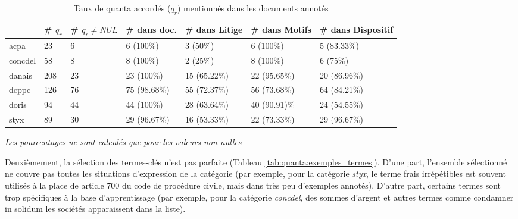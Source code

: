 \begin{table}[!htb]
	\scriptsize
	\begin{tabular}{|l|l|l|l|l|l|l|}
		\hline
		& \textbf{\# $q_r$} & \textbf{\# $q_r\neq NUL$} & \textbf{\# dans doc.} & \textbf{\# dans Litige} & \textbf{\# dans Motifs} & \textbf{\# dans Dispositif} \\ \hline
		acpa               & 23                & 6                       & 6 (100\%)             & 3 (50\%)                & 6 (100\%)               & 5 (83.33\%)                 \\ \hline
		concdel            & 58                & 8                       & 8 (100\%)             & 2 (25\%)                & 8 (100\%)               & 6 (75\%)                    \\ \hline
		danais             & 208               & 23                      & 23 (100\%)            & 15 (65.22\%)            & 22 (95.65\%)            & 20 (86.96\%)                \\ \hline
		dcppc              & 126               & 76                      & 75 (98.68\%)          & 55 (72.37\%)            & 56 (73.68\%)            & 64 (84.21\%)                \\ \hline
		doris              & 94                & 44                      & 44 (100\%)            & 28 (63.64\%)            & 40 (90.91)\%            & 24 (54.55\%)                \\ \hline
		styx               & 89                & 30                      & 29 (96.67\%)          & 16 (53.33\%)            & 22 (73.33\%)            & 29 (96.67\%)                \\ \hline
	\end{tabular}
	\textit{Les pourcentages ne sont calculés que pour les valeurs non nulles}
	\caption{Taux de quanta accordés ($q_r$) mentionnés dans les documents annotés} \label{tab:quanta:mentionQr}
\end{table}

Deuxièmement, la sélection des termes-clés n'est pas parfaite (Tableau \ref{tab:quanta:exemples_termes}). D'une part, l'ensemble sélectionné ne couvre  pas toutes les situations d'expression de la catégorie (par exemple, pour la catégorie \textit{styx}, le terme \og frais irrépétibles\fg{} est souvent utilisés à la place de \og article 700 du code de procédure civile\fg{}, mais dans très peu d'exemples annotés). D'autre part, certains termes sont trop spécifiques à la base d'apprentissage (par exemple, pour la catégorie \textit{concdel}, des sommes d'argent et autres termes comme \og condamner in solidum les sociétés \fg{} apparaissent dans la liste).

